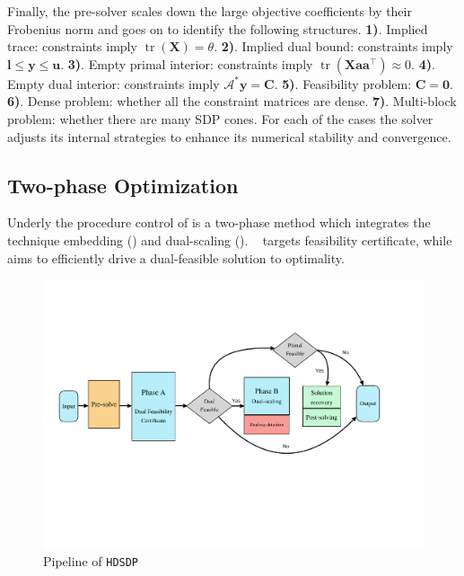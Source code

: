 
Finally, the pre-solver scales down the large objective coefficients by their Frobenius norm and goes on to identify the following structures. {\textbf{1)}}. Implied trace: constraints imply
$\ensuremath{\operatorname{tr}} ( \mathbf{X} ) = \theta$. {\textbf{2)}}. Implied dual bound:
constraints imply $\mathbf{l} \leq \mathbf{y} \leq \mathbf{u}$. {\textbf{3)}}. Empty
primal interior: constraints imply $\ensuremath{\operatorname{tr}} ( \mathbf{X} \mathbf{a} \mathbf{a}^{\top}
) \approx 0$. {\textbf{4)}}. Empty dual interior: constraints imply
$\mathcal{A}^{*} \mathbf{y} = \mathbf{C}$. {\textbf{5)}}. Feasibility problem: $\mathbf{C} = \textbf{0}$. {\textbf{6)}}. Dense problem: whether all the constraint matrices are dense.
{\textbf{7)}}. Multi-block problem: whether there are many SDP cones. For each of the cases the solver adjusts its internal strategies to enhance its numerical stability and convergence.

\subsection{Two-phase Optimization}

Underly the procedure control of {\hdsdp} is a two-phase method which integrates the technique
embedding () and dual-scaling (). \
 targets feasibility certificate, while  aims to efficiently drive a dual-feasible solution to optimality.

\begin{figure}[h]
\centering
\includegraphics[scale=0.45]{fig.pdf}
  \caption{Pipeline of {{\texttt{HDSDP}}}}
\end{figure}


